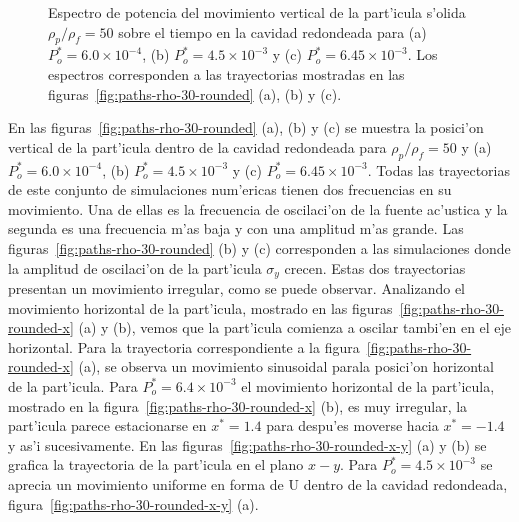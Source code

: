 \begin{figure}

%


\caption{\label{fig:paths-rho-30-rounded-spectrum}
Espectro de potencia del movimiento vertical de la part'icula s'olida $\rho_p/\rho_f=50$ sobre el tiempo en la cavidad redondeada para
(a) $P_o^\ast = 6.0\times 10^{-4} $,
(b) $P_o^\ast = 4.5\times 10^{-3}$
y
(c) $P_o^\ast = 6.45\times 10^{-3}$. Los espectros corresponden a las trayectorias mostradas en las 
figuras~\ref{fig:paths-rho-30-rounded} (a), (b) y (c).
}
\end{figure}
En las figuras~\ref{fig:paths-rho-30-rounded} (a), (b) y (c)  se muestra la posici'on vertical de la part'icula dentro de la
cavidad redondeada para $\rho_p/\rho_f = 50$ y (a) $P_o^\ast = 6.0\times 10^{-4} $, %
(b) $P_o^\ast = 4.5\times 10^{-3}$ y (c) $P_o^\ast = 6.45\times 10^{-3}$. Todas las trayectorias de este conjunto de
simulaciones num'ericas tienen dos frecuencias en su movimiento. Una de ellas es la frecuencia de oscilaci'on
de la fuente ac'ustica y la segunda es una frecuencia m'as baja y con una amplitud m'as grande. Las 
figuras~\ref{fig:paths-rho-30-rounded} (b) y (c) corresponden a las simulaciones donde la amplitud de oscilaci'on
de la part'icula $\sigma_y$ crecen. Estas dos trayectorias  presentan un movimiento irregular, como se 
puede observar. Analizando el movimiento horizontal de la part'icula, mostrado en las figuras~\ref{fig:paths-rho-30-rounded-x} (a) y (b),
vemos que la part'icula comienza a oscilar tambi'en en el eje horizontal. Para la
trayectoria correspondiente a la figura~\ref{fig:paths-rho-30-rounded-x} (a), se observa un movimiento sinusoidal parala posici'on
horizontal de la part'icula. Para $P_o^\ast = 6.4\times 10^{-3}$ el movimiento horizontal de la part'icula,
mostrado en la figura~\ref{fig:paths-rho-30-rounded-x} (b), es muy irregular, la part'icula parece estacionarse en 
$x^\ast = 1.4$ para despu'es moverse hacia $x^\ast = -1.4$ y as'i sucesivamente. En las figuras~\ref{fig:paths-rho-30-rounded-x-y}
(a) y (b) se grafica la trayectoria de la part'icula en el plano $x-y$. Para $P^\ast_o = 4.5 \times 10^{-3}$ se aprecia un 
movimiento uniforme en forma de U dentro de la cavidad redondeada, figura~\ref{fig:paths-rho-30-rounded-x-y} (a). 
